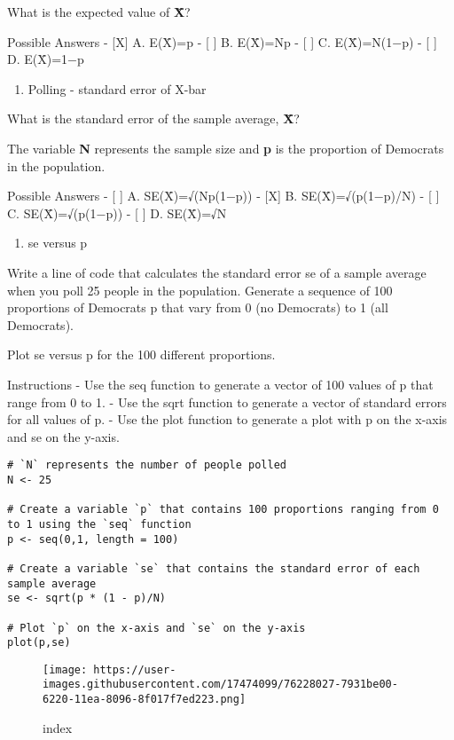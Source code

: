 \documentclass[
]{article}
\providecommand{\tightlist}{%
  \setlength{\itemsep}{0pt}\setlength{\parskip}{0pt}}
\begin{document}
What is the expected value of \textbf{X̄}?

Possible Answers - {[}X{]} A. E(X̄)=p - {[} {]} B. E(X̄)=Np - {[} {]} C.
E(X̄)=N(1−p) - {[} {]} D. E(X̄)=1−p

\begin{enumerate}
\def\labelenumi{\arabic{enumi}.}
\setcounter{enumi}{3}
\tightlist
\item
  Polling - standard error of X-bar
\end{enumerate}

What is the standard error of the sample average, \textbf{X̄}?

The variable \textbf{N} represents the sample size and \textbf{p} is the
proportion of Democrats in the population.

Possible Answers - {[} {]} A. SE(X̄)=√(Np(1−p)) - {[}X{]} B.
SE(X̄)=√(p(1−p)/N) - {[} {]} C. SE(X̄)=√(p(1−p)) - {[} {]} D. SE(X̄)=√N

\begin{enumerate}
\def\labelenumi{\arabic{enumi}.}
\setcounter{enumi}{4}
\tightlist
\item
  se versus p
\end{enumerate}

Write a line of code that calculates the standard error se of a sample
average when you poll 25 people in the population. Generate a sequence
of 100 proportions of Democrats p that vary from 0 (no Democrats) to 1
(all Democrats).

Plot se versus p for the 100 different proportions.

Instructions - Use the seq function to generate a vector of 100 values
of p that range from 0 to 1. - Use the sqrt function to generate a
vector of standard errors for all values of p. - Use the plot function
to generate a plot with p on the x-axis and se on the y-axis.

\begin{verbatim}
# `N` represents the number of people polled
N <- 25

# Create a variable `p` that contains 100 proportions ranging from 0 to 1 using the `seq` function
p <- seq(0,1, length = 100)

# Create a variable `se` that contains the standard error of each sample average
se <- sqrt(p * (1 - p)/N)

# Plot `p` on the x-axis and `se` on the y-axis
plot(p,se)
\end{verbatim}

\begin{figure}
\centering
\texttt{[image: https://user-images.githubusercontent.com/17474099/76228027-7931be00-6220-11ea-8096-8f017f7ed223.png]}
\caption{index}
\end{figure}
\end{document}
